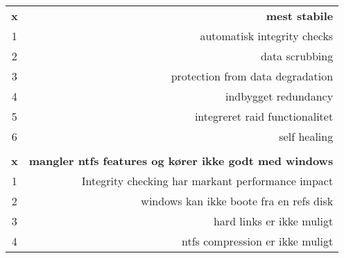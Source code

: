 


\begin{tabular}{|c|r|}	\hline
	\rowcolor{black!75}
	\multicolumn{2}{|c|}{\head{fordele}}	\\ \hline
	\textbf{x}	&	\textbf{mest stabile}								\\
	1	&	automatisk integrity checks							\\
	2	&	data scrubbing										\\
	3	&	protection from data degradation					\\
	4	&	indbygget redundancy								\\
	5	&	integreret raid functionalitet						\\
	6	&	self healing										\\
	\hline
	\rowcolor{black!75}
	\multicolumn{2}{|c|}{\head{Ulemper}}	\\ \hline
	\textbf{x}	&	\textbf{mangler ntfs features og kører ikke godt med windows}	\\
	1	&	Integrity checking har markant performance impact	\\
	2	&	windows kan ikke boote fra en refs disk				\\
	3	&	hard links er ikke muligt							\\
	4	&	ntfs compression er ikke muligt						\\
	\hline
\end{tabular}